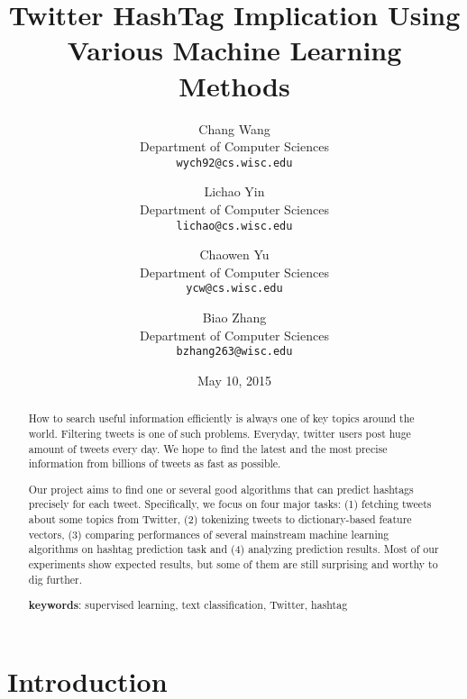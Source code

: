 \documentclass[letterpaper,11pt,twocolumn]{article}
\title{\bf{Twitter HashTag Implication Using Various Machine Learning Methods}}
\author{
  Chang Wang\\
  Department of Computer Sciences\\
  \texttt{wych92@cs.wisc.edu}
  \and
  Lichao Yin\\
  Department of Computer Sciences\\
  \texttt{lichao@cs.wisc.edu}
  \and
  Chaowen Yu\\
  Department of Computer Sciences\\
  \texttt{ycw@cs.wisc.edu}
  \and
  Biao Zhang\\
  Department of Computer Sciences\\
  \texttt{bzhang263@wisc.edu}
}
\date{May 10, 2015}
\begin{document}
\twocolumn[
\maketitle
]
\begin{abstract}
How to search useful information efficiently is always one of key topics around the world. Filtering tweets is one of such problems. Everyday, twitter users post huge amount of tweets every day. We hope to find the latest and the most precise information from billions of tweets as fast as possible.

Our project aims to find one or several good algorithms that can predict hashtags precisely for each tweet. Specifically, we focus on four major tasks: (1) fetching tweets about some topics from Twitter, (2) tokenizing tweets to dictionary-based feature vectors, (3) comparing performances of several mainstream machine learning algorithms on hashtag prediction task and (4) analyzing prediction results. Most of our experiments show expected results, but some of them are still surprising and worthy to dig further.


\textbf{keywords}: supervised learning, text classification, Twitter, hashtag
\end{abstract}

\section{Introduction}
\label{sec:intro}
\end{document}
